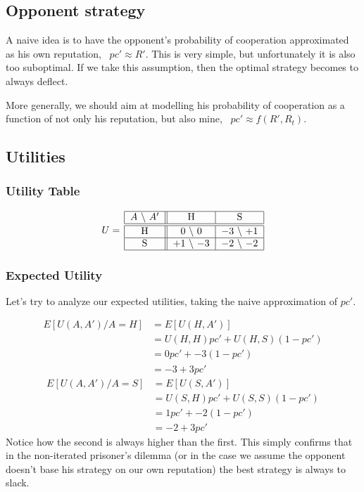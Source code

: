\documentclass[10pt,fleqn]{article}
\begin{document}
\subsection{Opponent strategy}

A naive idea is to have the opponent's probability of cooperation approximated
as his own reputation, \ie\ $pc' \approx R'$. This is very simple, but
unfortunately it is also too suboptimal. If we take this assumption, then the
optimal strategy becomes to always deflect.

More generally, we should aim at modelling his probability of cooperation as a
function of not only his reputation, but also mine, \ie\ $pc' \approx f(R',
R_t)$.

\subsection{Utilities}

\subsubsection{Utility Table}
\begin{equation*}
  U =\,
    \begin{tabular}{|c||c|c|}
      \hline
      $A$ \textbackslash\ $A'$ & H & S \\
      \hline\hline
      H & $0$ \textbackslash\ $0$ & $-3$ \textbackslash\ $+1$ \\
      \hline
      S & $+1$ \textbackslash\ $-3$ & $-2$ \textbackslash\ $-2$ \\
      \hline
    \end{tabular}
\end{equation*}

\subsubsection{Expected Utility}

Let's try to analyze our expected utilities, taking the naive approximation of
$pc'$.

\begin{align*}
  E[U(A, A') / A = H] &= E[U(H, A')] \\
                      &= U(H, H) pc' + U(H, S) (1-pc')\\
                      &= 0 pc' + -3 (1-pc') \\
                      &= -3 + 3 pc'
\end{align*}
\begin{align*}
  E[U(A, A') / A = S] &= E[U(S, A')] \\
                      &= U(S, H) pc' + U(S, S) (1-pc') \\
                      &= 1 pc' + -2 (1-pc') \\
                      &= -2 + 3 pc'
\end{align*}
Notice how the second is always higher than the first. This simply confirms that
in the non-iterated prisoner's dilemma (or in the case we assume the opponent
doesn't base his strategy on our own reputation) the best strategy is always to
slack.
\end{document}
